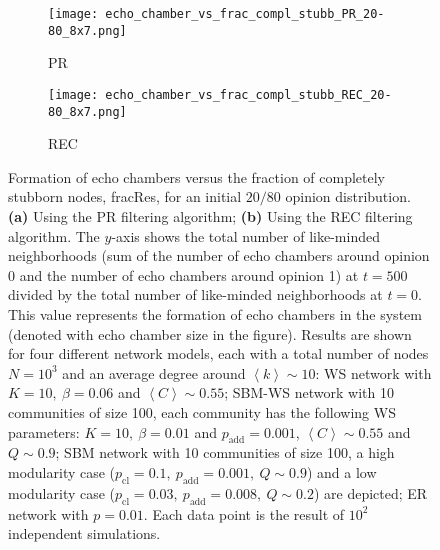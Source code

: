 \documentclass[11 pt , letterpaper , twoside , openright]{book}
\begin{document}
\begin{figure}[H]
  \begin{subfigure}[b]{0.49\textwidth}
  	\texttt{[image: echo\_chamber\_vs\_frac\_compl\_stubb\_PR\_20-80\_8x7.png]}
    \caption{PR}
    \label{PR_frac_compl_stubb_20-80}
  \end{subfigure}
  \begin{subfigure}[b]{0.49\textwidth}
  	\texttt{[image: echo\_chamber\_vs\_frac\_compl\_stubb\_REC\_20-80\_8x7.png]}
    \caption{REC}
    \label{REC_frac_compl_stubb_20-80}
  \end{subfigure}
  \captionsetup{format=plain}
  \caption[Formation of echo chambers versus fraction of completely stubborn nodes for the PR and REC filtering algorithms and an initial $20/80$ opinion distribution]{Formation of echo chambers versus the fraction of completely stubborn nodes, fracRes, for an initial $20/80$ opinion distribution. \textbf{(a)} Using the PR filtering algorithm; \textbf{(b)} Using the REC filtering algorithm. The $y$-axis shows the total number of like-minded neighborhoods (sum of the number of echo chambers around opinion 0 and the number of echo chambers around opinion 1) at $t=500$ divided by the total number of like-minded neighborhoods at $t=0$. This value represents the formation of echo chambers in the system (denoted with echo chamber size in the figure). Results are shown for four different network models, each with a total number of nodes $N=10^3$ and an average degree around $\left<k\right> \sim 10$: WS network with $K =10,\ \beta = 0.06$ and $\left<C\right> \sim 0.55$; SBM-WS network with 10 communities of size 100, each community has the following WS parameters: $K = 10,\ \beta = 0.01$ and $p_{\text{add}} = 0.001$, $\left<C\right> \sim 0.55$ and $Q \sim 0.9$; SBM network with 10 communities of size 100, a high modularity case ($p_{\text{cl}} = 0.1,\ p_{\text{add}} = 0.001,\ Q \sim 0.9$) and a low modularity case ($p_{\text{cl}} = 0.03,\ p_{\text{add}} = 0.008,\ Q \sim 0.2$) are depicted; ER network with $p= 0.01$. Each data point is the result of $10^2$ independent simulations.}
\label{echo_vs_frac_complStubb_PR-REC_20-80}
\end{figure}
\end{document}
